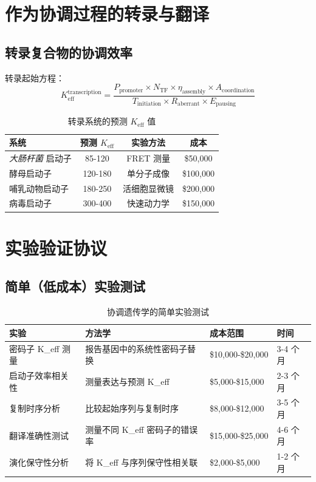 \documentclass[12pt]{article}
\begin{document}
	\section{作为协调过程的转录与翻译}
	
	\subsection{转录复合物的协调效率}
	
	转录起始方程：
	\[
	K_{\text{eff}}^{\text{transcription}} = \frac{P_{\text{promoter}} \times N_{\text{TF}} \times \eta_{\text{assembly}} \times A_{\text{coordination}}}{T_{\text{initiation}} \times R_{\text{aberrant}} \times E_{\text{pausing}}}
	\]
	
	\begin{table}[H]
		\centering
		\caption{转录系统的预测 $K_{\text{eff}}$ 值}
		\begin{tabular}{lccc}
			\toprule
			\textbf{系统} & \textbf{预测 $K_{\text{eff}}$} & \textbf{实验方法} & \textbf{成本} \\
			\midrule
			\textit{大肠杆菌} 启动子 & 85-120 & FRET 测量 & \$50,000 \\
			酵母启动子 & 120-180 & 单分子成像 & \$100,000 \\
			哺乳动物启动子 & 180-250 & 活细胞显微镜 & \$200,000 \\
			病毒启动子 & 300-400 & 快速动力学 & \$150,000 \\
			\bottomrule
		\end{tabular}
	\end{table}
	
	\section{实验验证协议}
	
	\subsection{简单（低成本）实验测试}
	
	\begin{table}[H]
		\centering
		\caption{协调遗传学的简单实验测试}
		\begin{tabular}{p{4cm}p{5cm}p{3cm}p{2cm}}
			\toprule
			\textbf{实验} & \textbf{方法学} & \textbf{成本范围} & \textbf{时间} \\
			\midrule
			密码子 K\_eff 测量 & 报告基因中的系统性密码子替换 & \$10,000-\$20,000 & 3-4 个月 \\
			启动子效率相关性 & 测量表达与预测 K\_eff & \$5,000-\$15,000 & 2-3 个月 \\
			复制时序分析 & 比较起始序列与复制时序 & \$8,000-\$12,000 & 3-5 个月 \\
			翻译准确性测试 & 测量不同 K\_eff 密码子的错误率 & \$15,000-\$25,000 & 4-6 个月 \\
			演化保守性分析 & 将 K\_eff 与序列保守性相关联 & \$2,000-\$5,000 & 1-2 个月 \\
			\bottomrule
		\end{tabular}
	\end{table}
	
\end{document}
